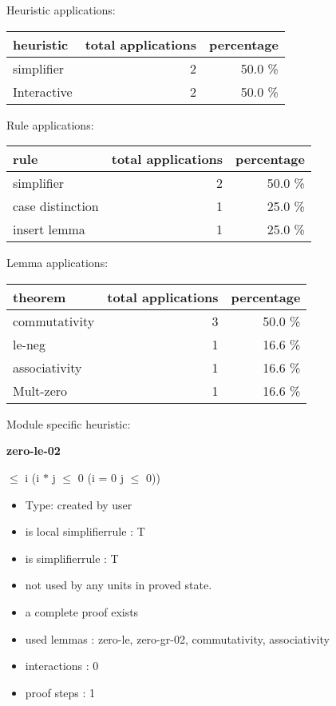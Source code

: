 \documentclass[a4paper]{article}
\begin{document}
\medskip


Heuristic applications:

\begin{supertabular}{l|r|r}
heuristic	& total applications & percentage \\ \hline
simplifier & 2 & 50.0 \% \\
Interactive & 2 & 50.0 \% \\

\end{supertabular}

Rule applications:

\begin{supertabular}{l|r|r}
rule	        & total applications & percentage \\ \hline
simplifier & 2 & 50.0 \% \\
case distinction & 1 & 25.0 \% \\
insert lemma & 1 & 25.0 \% \\

\end{supertabular}

Lemma applications:

\begin{supertabular}{l|r|r}
theorem	        & total applications & percentage \\ \hline
commutativity & 3 & 50.0 \% \\
le-neg & 1 & 16.6 \% \\
associativity & 1 & 16.6 \% \\
Mult-zero & 1 & 16.6 \% \\

\end{supertabular}

Module specific heuristic:

\pagebreak

{\LARGE\bf zero-le-02}\label{lemma-zero-le-02}

\medskip

  $\le$ i \Imp (i $*$ j $\le$ 0 \Equiv \Not \Not (i = 0 \Or j $\le$ 0))

\begin{itemize}

\item Type: created by user

\item is local simplifierrule : T
\item is simplifierrule : T
\item not used by any units in proved state.
\item       a complete proof exists
\item       used lemmas  : zero-le, zero-gr-02, commutativity, associativity
\item       interactions : 0
\item       proof steps  : 1
\end{itemize}
\end{document}
